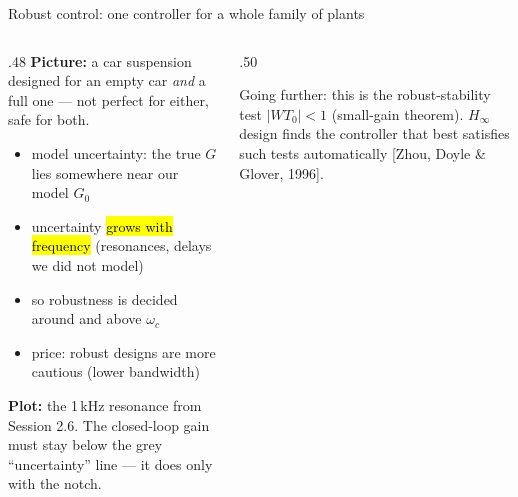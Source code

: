 \documentclass[aspectratio=169,10pt]{beamer}
\begin{document}
\begin{frame}{Robust control: one controller for a whole family of plants}
\begin{columns}[T]
\begin{column}{.48\textwidth}
\small
\textbf{Picture:} a car suspension designed for an empty car \emph{and} a full one --- not perfect for either, safe for both.
\begin{itemize}\setlength\itemsep{.4mm}
\item model uncertainty: the true $G$ lies somewhere near our model $G_0$
\item uncertainty \hl{grows with frequency} (resonances, delays we did not model)
\item so robustness is decided around and above $\omega_c$
\item price: robust designs are more cautious (lower bandwidth)
\end{itemize}
\textbf{Plot:} the 1\,kHz resonance from Session 2.6. The closed-loop gain must stay below the grey ``uncertainty'' line --- it does only with the notch.
\end{column}
\begin{column}{.50\textwidth}
\centering
{}

\vspace{1mm}
{\scriptsize\color{mkGray}Going further: this is the robust-stability test $|W T_0|<1$ (small-gain theorem). $H_\infty$ design finds the controller that best satisfies such tests automatically [Zhou, Doyle \& Glover, 1996].}
\end{column}
\end{columns}
\end{frame}
\end{document}
